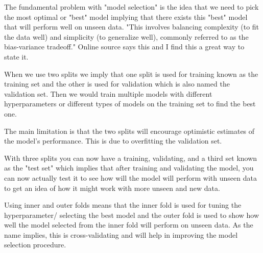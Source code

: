 \documentclass[12pt]{article}
\begin{document}
\begin{enumerate}


The fundamental problem with "model selection" is the idea that we need to pick the most optimal or "best" model implying that there exists this "best" model that will perform well on unseen data. "This involves balancing complexity (to fit the data well) and simplicity (to generalize well), commonly referred to as the bias-variance tradeoff." Online source says this and I find this a great way to state it.


When we use two splits we imply that one split is used for training known as the training set and the other is used for validation which is also named the validation set. Then we would train multiple models with different hyperparameters or different types of models on the training set to find the best one.


The main limitation is that the two splits will encourage optimistic estimates of the model's performance. This is due to overfitting the validation set.


With three splits you can now have a training, validating, and a third set known as the "test set" which implies that after training and validating the model, you can now actually test it to see how will the model will perform with unseen data to get an idea of how it might work with more unseen and new data.


Using inner and outer folds means that the inner fold is used for tuning the hyperparameter/ selecting the best model and the outer fold is used to show how well the model selected from the inner fold will perform on unseen data. As the name implies, this is cross-validating and will help in improving the model selection procedure.



\end{enumerate}
\end{document}

